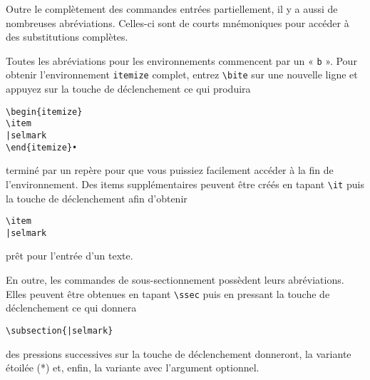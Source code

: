\documentclass[11pt,french]{article}
\newcommand{\cmd}[1]{\texttt{#1}}
\begin{document}
Outre le complètement des commandes entrées partiellement, il y a aussi de nombreuses abréviations. Celles-ci sont de courts mnémoniques pour accéder à des substitutions complètes.

Toutes les abréviations pour les environnements commencent par un « \texttt{b} ». Pour obtenir l'environnement  \cmd{itemize} complet, entrez \verb|\bite| sur une nouvelle ligne et appuyez sur la touche de déclenchement ce qui produira

%
\begin{verbatim}
\begin{itemize}
\item
|selmark
\end{itemize}•
\end{verbatim}
terminé par un repère pour que vous puissiez facilement accéder à la fin de l'environnement. Des items supplémentaires peuvent être créés en tapant \verb|\it| puis la touche de déclenchement afin d'obtenir
\begin{verbatim}
\item
|selmark
\end{verbatim}
prêt pour l'entrée d'un texte.

En outre, les commandes de sous-sectionnement possèdent leurs abréviations. Elles peuvent être obtenues en tapant  \verb|\ssec| puis en pressant la touche de déclenchement ce qui donnera

\begin{verbatim}
\subsection{|selmark}
\end{verbatim}
des pressions successives sur la touche de déclenchement donneront, la variante étoilée (*) et, enfin, la variante avec l'argument optionnel.
\end{document}
